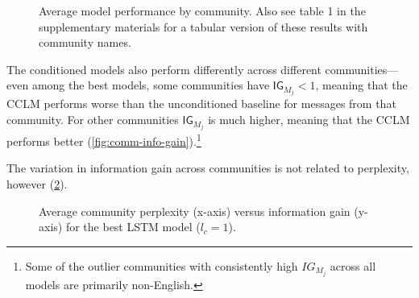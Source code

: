 \documentclass[11pt]{article}
\newcommand\Ppl{\mathsf{Ppl}}
\newcommand\IG{\mathsf{IG}}
\begin{document}
\newcommand{\modelboxplot}[3]{
  \addplot+[
    boxplot={draw position=#3, box extend=0.3}, 
    draw=#2, mark=*, mark options={fill=#2, scale=0.5}, solid, fill=#2!10,
    area legend] 
    table [y=#1] {floats/comm.csv};
}
\begin{figure}[t]
\caption{
   Average model performance by community. 
   Also see table 1 in the supplementary materials
   for a tabular version of these results with community names.
}
\label{fig:comm-stratified-box}
\end{figure}

The conditioned models also perform differently across different communities---%
even among the best models, some communities have $\IG_{M_j} < 1$,
meaning that the CCLM performs worse than the unconditioned baseline for 
messages from that community.
For other communities $\IG_{M_j}$ is much higher, meaning that the CCLM performs better  
(\cref{fig:comm-info-gain}).\footnote{
  Some of the outlier communities with consistently high $IG_{M_j}$ 
  across all models are primarily non-English.}

The variation in information gain across communities is not 
related to perplexity, however (\cref{fig:ppl-info-gain}).

\begin{figure}
\caption{
  Average community perplexity (x-axis) versus information gain (y-axis)
  for the best LSTM model ($l_c = 1$).
}
\label{fig:ppl-info-gain}
\end{figure}
\end{document}
